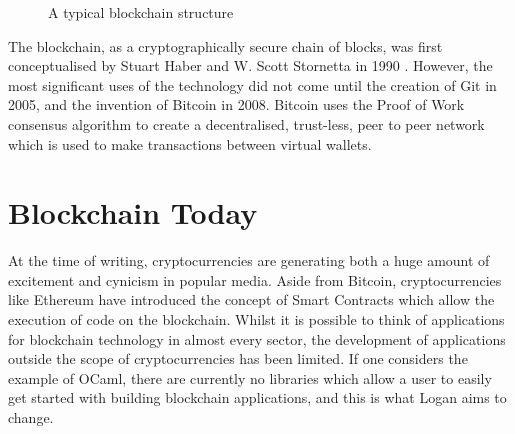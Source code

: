 \documentclass[12pt,a4paper,twoside,openright]{report}
\begin{document}
	\begin{figure}
		\begin{center}
			\end{center}
		\caption{A typical blockchain structure}
		\label{fig:mainblockchain}
	\end{figure}
	The blockchain, as a cryptographically secure chain of blocks, was first conceptualised by Stuart Haber and W. Scott Stornetta in 1990 \parencite{10.1007/3-540-38424-3_32}.
	However, the most significant uses of the technology did not come until the creation of Git \parencite{Git} in 2005, and the invention of Bitcoin \parencite{Bitcoin} in 2008.
	Bitcoin uses the Proof of Work consensus algorithm to create a decentralised, trust-less, peer to peer network which is used to make transactions between virtual wallets.

	\section{Blockchain Today}
	At the time of writing, cryptocurrencies are generating both a huge amount of excitement and cynicism in popular media. 
	Aside from Bitcoin, cryptocurrencies like Ethereum \parencite{Ethereum} have introduced the concept of Smart Contracts which allow the execution of code on the blockchain.
	Whilst it is possible to think of applications for blockchain technology in almost every sector, the development of applications outside the scope of cryptocurrencies has been limited. 
	If one considers the example of OCaml, there are currently no libraries which allow a user to easily get started with building blockchain applications, and this is what Logan aims to change. \\
\end{document}
